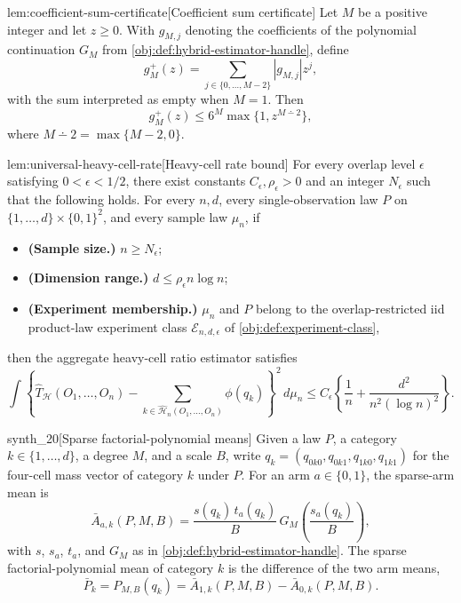 \begin{lemmav}{lem:coefficient-sum-certificate}[Coefficient sum certificate]
Let \(M\) be a positive integer and let \(z\ge 0\). With \(g_{M,j}\) denoting the coefficients of the polynomial continuation \(G_M\) from \cref{obj:def:hybrid-estimator-handle}, define
\[
g_M^+(z)
=
\sum_{j\in\{0,\ldots,M-2\}} |g_{M,j}| z^j,
\]
with the sum interpreted as empty when \(M=1\). Then
\[
g_M^+(z)
\le
6^M \max\{1,z^{M\dotminus 2}\},
\]
where \(M\dotminus 2=\max\{M-2,0\}\).
\end{lemmav}

\begin{lemmav}{lem:universal-heavy-cell-rate}[Heavy-cell rate bound]
For every overlap level \(\epsilon\) satisfying \(0<\epsilon<1/2\), there exist constants \(C_\epsilon,\rho_\epsilon>0\) and an integer \(N_\epsilon\) such that the following holds. For every \(n,d\), every single-observation law \(P\) on \(\{1,\ldots,d\}\times\{0,1\}^2\), and every sample law \(\mu_n\), if
\begin{itemize}
\item \textbf{(Sample size.)} \(n\ge N_\epsilon\);
\item \textbf{(Dimension range.)} \(d\le \rho_\epsilon n\log n\);
\item \textbf{(Experiment membership.)} \(\mu_n\) and \(P\) belong to the overlap-restricted iid product-law experiment class \(\mathcal E_{n,d,\epsilon}\) of \cref{obj:def:experiment-class},
\end{itemize}
then the aggregate heavy-cell ratio estimator satisfies
\[
\int \left\{
\widehat T_{\mathcal H}(O_1,\ldots,O_n)
-
\sum_{k\in\widehat{\mathcal H}_n(O_1,\ldots,O_n)} \phi(q_k)
\right\}^2\,d\mu_n
\le
C_\epsilon\left\{
\frac1n+\frac{d^2}{n^2(\log n)^2}
\right\}.
\]
\end{lemmav}

\begin{definitionv}{synth_20}[Sparse factorial-polynomial means]
Given a law \(P\), a category \(k\in\{1,\ldots,d\}\), a degree \(M\), and a scale \(B\), write \(q_k=(q_{0k0},q_{0k1},q_{1k0},q_{1k1})\) for the four-cell mass vector of category \(k\) under \(P\). For an arm \(a\in\{0,1\}\), the sparse-arm mean is \[ \bar A_{a,k}(P,M,B) = \frac{s(q_k)\,t_a(q_k)}{B}\,G_M\!\left(\frac{s_a(q_k)}{B}\right), \] with \(s\), \(s_a\), \(t_a\), and \(G_M\) as in \cref{obj:def:hybrid-estimator-handle}. The sparse factorial-polynomial mean of category \(k\) is the difference of the two arm means, \[ \bar P_k = P_{M,B}(q_k) = \bar A_{1,k}(P,M,B) - \bar A_{0,k}(P,M,B). \]
\end{definitionv}

